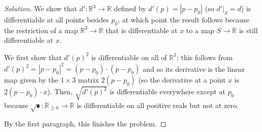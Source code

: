 \documentclass[10pt]{scrartcl}
\providecommand{\RR}{\mathbb R}
\newenvironment{soln}{\begin{proof}[Solution]}{\end{proof}}
\begin{document}
\begin{soln}
	We show that $d'\colon\RR^3\to\RR$ defined by
	$d'(p) = |p - p_0|$ (so $d'|_S = d$) is differentiable
	at all points besides $p_0$, at which point the result follows
	because the restriction of a map $\RR^3\to\RR$
	that is differentiable at $x$ to a map $S\to\RR$
	is still differentiable at $x$.
	
	We first show that $d'(p)^2$ is differentiable on all of $\RR^3$;
	this follows from $d'(p)^2 = |p - p_0|^2 = (p - p_0)\cdot(p - p_0)$
	and so its derivative is the linear map given by the $1\times 3$ matrix
	$2(p - p_0)$ (so the derivative at a point $x$ is $2(p-p_0)\cdot x$).
	Then, $\sqrt{d'(p)^2}$ is differentiable everywhere except at $p_0$
	because $\sqrt\bullet\colon\RR_{\ge0}\to\RR$
	is differentiable on all positive reals but not at zero.
	
	By the first paragraph, this finishes the problem.
\end{soln}
\end{document}
